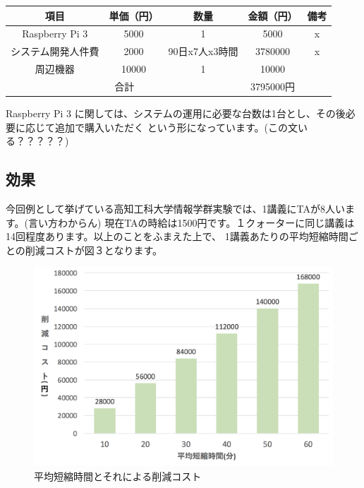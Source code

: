 \documentclass[a4j,titlepage]{ujarticle}
\begin{document}
\begin{table}[htb]
  \begin{tabular}{|c|c|c|c|c|} \hline
    項目 & 単価（円） & 数量 & 金額（円） & 備考 \\ \hline
     Raspberry Pi 3 &  5000&  1&  5000& x \\ \hline
     システム開発人件費&  2000& 90日x7人x3時間&3780000&x  \\ \hline
     周辺機器&  10000&  1&  10000&  \\ \hline
    \multicolumn{3}{|c|}{合計}& 3795000円 &  \\ \hline
  \end{tabular}
\end{table}

Raspberry Pi 3 に関しては、システムの運用に必要な台数は1台とし、その後必要に応じて追加で購入いただく
という形になっています。(この文いる？？？？？)

\subsection{効果}
今回例として挙げている高知工科大学情報学群実験では、1講義にTAが8人います。(言い方わからん)
現在TAの時給は1500円です。１クォーターに同じ講義は14回程度あります。以上のことをふまえた上で、
1講義あたりの平均短縮時間ごとの削減コストが図３となります。
\begin{figure}[h]

\centering
   \includegraphics[width=13cm]{sisan.png}
  \caption{平均短縮時間とそれによる削減コスト}
\end{figure}
\end{document}
